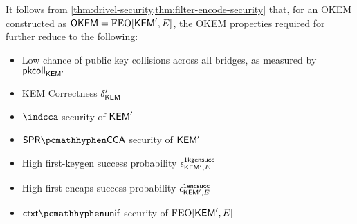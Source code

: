 \begin{corollary}
\label{cor:drivel-security-filter-encode}
    It follows from \cref{thm:drivel-security,thm:filter-encode-security} that, for an OKEM constructed as $\mathsf{OKEM} = \textsf{\textnormal{FEO}}[\mathsf{KEM}',E]$, the OKEM properties required for \drivel{} further reduce to the following:
    \begin{itemize}
        \item Low chance of public key collisions across all bridges, as measured by $\mathsf{pkcoll}_{\mathsf{KEM}'}$
        \item KEM Correctness $\delta_{\mathsf{KEM}}'$
        \item $\indcca$ security of $\mathsf{KEM}'$
        \item $\sprcca$ security of $\mathsf{KEM}'$
        \item High first-keygen success probability $\epsilon^{\mathsf{1kgensucc}}_{\mathsf{KEM}',E}$
        \item High first-encaps success probability $\epsilon^{\mathsf{1encsucc}}_{\mathsf{KEM}',E}$
        \item $\ctxtunif$ security of $\textsf{\textnormal{FEO}}[\mathsf{KEM}',E]$
    \end{itemize}
\end{corollary}